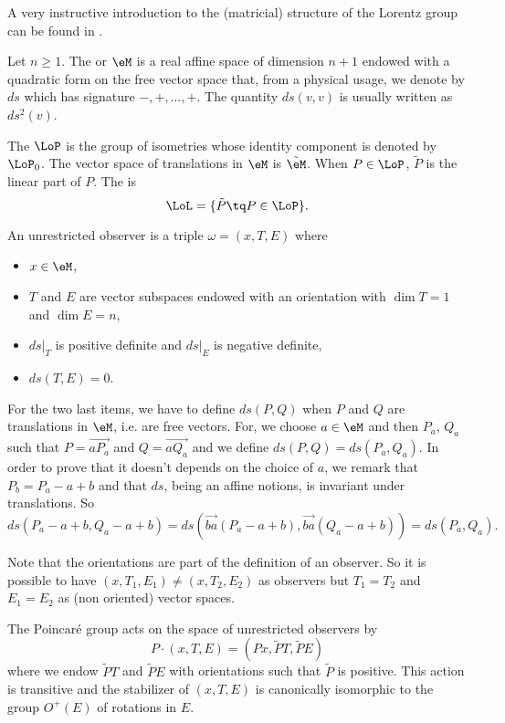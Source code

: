 A very instructive introduction to the (matricial) structure of the Lorentz group can be found in \cite{Schomblond_em}.

Let $n\geq 1$. The  or  $\eM$ is a real affine space of dimension $n+1$ endowed with a quadratic form on the free vector space that, from a physical usage,  we denote by $ds$ which has signature $-,+,\ldots,+$. The quantity $ds(v,v)$ is usually written as $ds^2(v)$.

The  $\LoP$ is the group of isometries whose identity component is denoted by $\LoP_0$. The vector space of translations in $\eM$ is $\tilde\eM$. When $P\in\LoP$, $\tilde P$ is the linear part of $P$. The  is
\[ 
  \LoL=\{ \tilde P\tq P\in\LoP \}.
\]

An unrestricted observer is a triple $\omega=(x,T,E)$ where 

\begin{itemize}
\item $x\in\eM$,
\item $T$ and $E$ are vector subspaces endowed with an orientation with $\dim T=1$ and $\dim E=n$,
\item $ds|_T$ is positive definite and $ds|_E$ is negative definite,
\item $ds(T,E)=0$.
\end{itemize}
For the two last items, we have to define $ds(P,Q)$ when $P$ and $Q$ are translations in $\eM$, i.e. are free vectors. For, we choose $a\in\eM$ and then $P_a$, $Q_a$ such that $P=\overrightarrow{aP_a}$ and $Q=\overrightarrow{aQ_a}$ and we define $ds(P,Q)=ds(P_a,Q_a)$. In order to prove that it doesn't depends on the choice of $a$, we remark that $P_b=P_a-a+b$ and that $ds$, being an affine notions, is invariant under translations. So
\[ 
ds(P_a-a+b,Q_a-a+b)=ds(\overrightarrow{ba}(P_a-a+b),\overrightarrow{ba}(Q_a-a+b))
		=ds(P_a,Q_a).
\]

Note that the orientations are part of the definition of an observer. So it is possible to have $(x,T_1,E_1)\neq(x,T_2,E_2)$ as observers but $T_1=T_2$ and $E_1=E_2$ as (non oriented) vector spaces.

The Poincaré group acts on the space of unrestricted observers by 
\begin{equation}
P\cdot(x,T,E)=(Px,\tilde PT,\tilde PE)
\end{equation}
where we endow $\tilde PT$ and $\tilde PE$ with orientations such that $\tilde P$ is positive. This action is transitive and the stabilizer of $(x,T,E)$ is canonically isomorphic to the group $O^+(E)$ of rotations in $E$.


